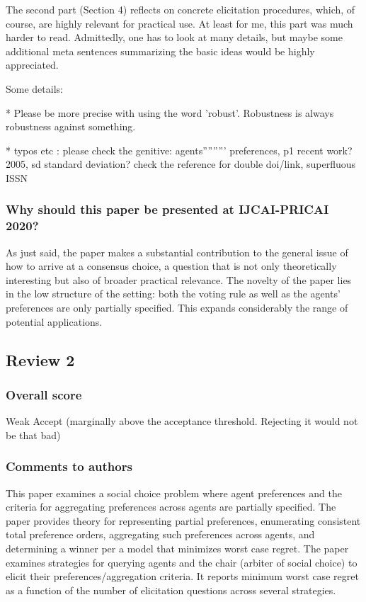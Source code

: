 \documentclass[version=3.21, pagesize, twoside=off, bibliography=totoc, DIV=calc, fontsize=12pt, a4paper]{scrartcl}
\begin{document}
The second part (Section 4) reflects on concrete elicitation procedures, which, of course, are highly relevant for practical use. At least for me, this part was much harder to read. Admittedly, one has to look at many details, but maybe some additional meta sentences summarizing the basic ideas would be highly appreciated.

Some details:

* Please be more precise with using the word 'robust'. Robustness is always robustness against something.

* typos etc : please check the genitive: agents''''''''' preferences,
p1 recent work? 2005,
sd standard deviation?
check the reference for double doi/link, superfluous ISSN



\subsubsection*{Why should this paper be presented at IJCAI-PRICAI 2020?}
As just said, the paper makes a substantial contribution to the general issue of how to arrive at a consensus choice, a question that is not only theoretically interesting but also of broader practical relevance. The novelty of the paper lies in the low structure of the setting: both the voting rule as well as the agents' preferences are only partially specified. This expands considerably the range of potential applications.

\subsection{Review 2}
\subsubsection*{Overall score}
Weak Accept (marginally above the acceptance threshold. Rejecting it would not be that bad)
\subsubsection*{Comments to authors}
This paper examines a social choice problem where agent preferences and the criteria for aggregating preferences across agents are partially specified. The paper provides theory for representing partial preferences, enumerating consistent total preference orders, aggregating such preferences across agents, and determining a winner per a model that minimizes worst case regret. The paper examines strategies for querying agents and the chair (arbiter of social choice) to elicit their preferences/aggregation criteria. It reports minimum worst case regret as a function of the number of elicitation questions across several strategies.
\end{document}
